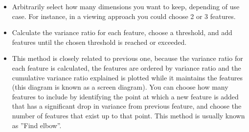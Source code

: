 \begin{itemize}
\item Arbitrarily select how many dimensions you want to keep, depending of use case. For instance, in a viewing approach you could choose 2 or 3 features.
\item Calculate the variance ratio for each feature, choose a threshold, and add features until the chosen threshold is reached or exceeded.
\item This method is closely related to previous one, because the variance ratio for each feature is calculated, the features are ordered by variance ratio and the cumulative variance ratio explained  is plotted while it maintains the features (this diagram is known as a screen diagram). You can choose how many features to include by identifying the point at which a new feature is added that has a significant drop in variance from previous feature, and choose the number of features that exist up to that point. This method is usually known as ''Find elbow''.
\end{itemize}


